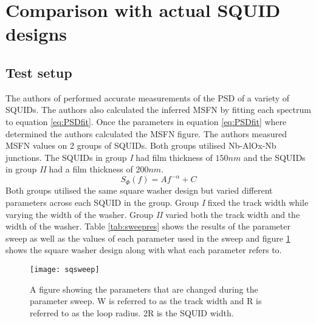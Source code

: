 \section{Comparison with actual SQUID designs}
\subsection{Test setup}
The authors of \cite{fluxNoiseSquidsStevenAnton} performed accurate measurements of the PSD of a variety of SQUIDs. The authors also calculated the inferred MSFN by fitting each spectrum to equation \ref{eq:PSDfit}. Once the parameters in equation \ref{eq:PSDfit} where determined the authors calculated the MSFN figure. The authors measured MSFN values on 2 groups of SQUIDs. Both groups utilised Nb-AlOx-Nb junctions. The SQUIDs in group \textit{I} had film thickness of $150 nm$ and the SQUIDs in group \textit{II} had a film thickness of $200 nm$. 
\begin{equation}
    S_\Phi (f) = Af^{-\alpha}+C
    \label{eq:PSDfit}
\end{equation}
Both groups utilised the same square washer design but varied different parameters across each SQUID in the group. Group \textit{I} fixed the track width while varying the width of the washer. Group \textit{II} varied both the track width and the width of the washer. Table \ref{tab:sweepres} shows the results of the parameter sweep as well as the values of each parameter used in the sweep and figure \ref{fig:sqsweep} shows the square washer design along with what each parameter refers to.

\begin{figure}[H]
    \centering
    \texttt{[image: sqsweep]}
    \caption{A figure showing the parameters that are changed during the parameter sweep. W is referred to as the track width and R is referred to as the loop radius. 2R is the SQUID width.}
    \label{fig:sqsweep}
\end{figure}
